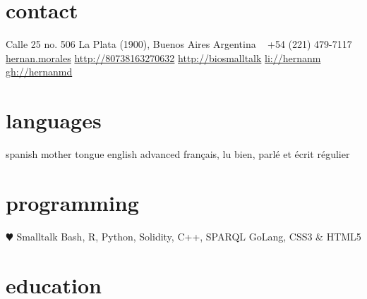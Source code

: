 \documentclass[]{friggeri-cv} %
\begin{document}


\begin{aside} %
\section{contact}
Calle 25 no. 506
La Plata (1900), Buenos Aires
Argentina
~
+54 (221) 479-7117
~
\href{mailto:hernan.morales@gmail.com}{hernan.morales}
\href{http://80738163270632.blogspot.com/}{http://80738163270632}
\href{http://biosmalltalk.blogspot.com/}{http://biosmalltalk}
\href{https://www.linkedin.com/in/hernanm}{li://hernanm}
\href{https://github.com/hernanmd}{gh://hernanmd}
\section{languages}
spanish mother tongue
english advanced
français, lu bien, parlé et écrit régulier
\section{programming}
{\color{red} $\varheartsuit$} Smalltalk
Bash, R, Python, Solidity, C++, SPARQL
GoLang, CSS3 \& HTML5
\end{aside}


\section{education}
\end{document}
